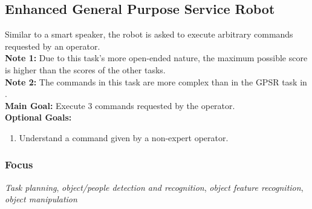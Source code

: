 \subsection{Enhanced General Purpose Service Robot}
\label{test:egpsr}
Similar to a smart speaker, the robot is asked to execute arbitrary commands requested by an operator.\\
\textbf{Note 1:} Due to this task's more open-ended nature, the maximum possible score is higher than the scores of the other \STWO{} tasks.\\
\textbf{Note 2:} The commands in this task are more complex than in the GPSR task in \SONE.\\

\noindent \textbf{Main Goal:} Execute 3 commands requested by the operator.\\

\noindent \textbf{Optional Goals:}
\begin{enumerate}[nosep]
	\item Understand a command given by a non-expert operator.
\end{enumerate}

\subsubsection*{Focus}
\emph{Task planning}, \emph{object/people detection and recognition}, \emph{object feature recognition}, \emph{object manipulation}


